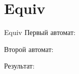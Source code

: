 \section{Equiv}
\begin{frame}{Equiv}
	Первый автомат:


	Второй автомат:


	Результат:



\end{frame}

